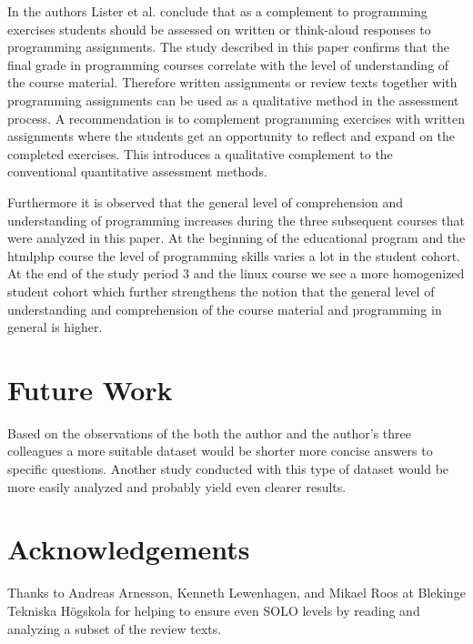 \documentclass[twoside,twocolumn,a4paper,11pt,english]{article}
\begin{document}
In \cite{lister2006not} the authors Lister et al. conclude that as a complement to programming exercises students should be assessed on written or think-aloud responses to programming assignments. The study described in this paper confirms that the final grade in programming courses correlate with the level of understanding of the course material. Therefore written assignments or review texts together with programming assignments can be used as a qualitative method in the assessment process. A recommendation is to complement programming exercises with written assignments where the students get an opportunity to reflect and expand on the completed exercises. This introduces a qualitative complement to the conventional quantitative assessment methods.

Furthermore it is observed that the general level of comprehension and understanding of programming increases during the three subsequent courses that were analyzed in this paper. At the beginning of the educational program and the htmlphp course the level of programming skills varies a lot in the student cohort. At the end of the study period 3 and the linux course we see a more homogenized student cohort which further strengthens the notion that the general level of understanding and comprehension of the course material and programming in general is higher.




\section{Future Work}

Based on the observations of the both the author and the author's three colleagues a more suitable dataset would be shorter more concise answers to specific questions. Another study conducted with this type of dataset would be more easily analyzed and probably yield even clearer results.




\section{Acknowledgements}

Thanks to Andreas Arnesson, Kenneth Lewenhagen, and Mikael Roos at Blekinge Tekniska Högskola for helping to ensure even SOLO levels by reading and analyzing a subset of the review texts.
\end{document}
